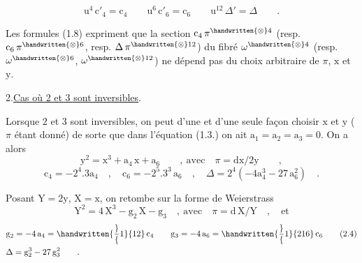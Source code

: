 \[
\mathrm{u}^{4}\,\mathrm{c}'_{4}=\mathrm{c}_{4}\qquad
\mathrm{u}^{6}\,\mathrm{c}'_{6}=\mathrm{c}_{6}\qquad
\mathrm{u}^{12}\,\Delta'=\Delta\qquad.
\tag*{(1.8)}
\]

Les formules (1.8) expriment que la section $\mathrm{c}_{4}\,\pi^{\handwritten{\otimes}4}$ (resp. $\mathrm{c}_{6}\,\pi^{\handwritten{\otimes}6}$, resp. $\Delta\,\pi^{\handwritten{\otimes}12}$) du fibré $\omega^{\handwritten{\otimes}4}$ (resp. $\omega^{\handwritten{\otimes}6}$, $\omega^{\handwritten{\otimes}12}$) ne dépend pas du choix arbitraire de $\pi$, $\mathrm{x}$ et $\mathrm{y}$.
\par\noindent\hfill
{}
\par\vspace{7.7\baselineskip}

2.\qquad \uline{Cas où 2 et 3 sont inversibles}.\margin{\handwritten{$\backslash$}}

Lorsque $2$ et $3$ sont inversibles, on peut d'une et d'une seule façon choisir $\mathrm{x}$ et $\mathrm{y}$ ($\pi$ étant donné) de sorte que dans l'équation (1.3.) on ait $\mathrm{a}_{1}=\mathrm{a}_{2}=\mathrm{a}_{3}=0$. On a alors
\[
\mathrm{y}^{2}=\mathrm{x}^{3}+\mathrm{a}_{4}\,\mathrm{x}+\mathrm{a}_{6}\qquad,\ \text{avec}\quad\pi=\mathrm{dx}/2\mathrm{y}\qquad,
\tag*{(2.1)}
\]
\[
\mathrm{c}_{4}=-2^{4}.3\mathrm{a}_{4}\quad,\quad
\mathrm{c}_{6}=-2^{5}.3^{3}\,\mathrm{a}_{6}\quad,\quad
\Delta=2^{4}(-4\mathrm{a}_{4}^{3}-27\,\mathrm{a}_{6}^{2})\quad.
\tag*{(2.2)}
\]

Posant $\mathrm{Y}=2\mathrm{y}$, $\mathrm{X}=\mathrm{x}$, on retombe sur la forme de Weierstrass
\[
\mathrm{Y}^{2}=4\,\mathrm{X}^{3}-\mathrm{g}_{2}\,\mathrm{X}-\mathrm{g}_{3}\quad,\ \text{avec}\quad\pi=\mathrm{d}\,\mathrm{X}/\mathrm{Y}\quad,\quad\text{et}
\tag*{(2.3)}
\]
\[
\begin{aligned}[t]
&\mathrm{g}_{2}=-4\,\mathrm{a}_{4}=\handwritten{\frac}{1}{12}\,\mathrm{c}_{4}\qquad
\mathrm{g}_{3}=-4\,\mathrm{a}_{6}=\handwritten{\frac}{1}{216}\,\mathrm{c}_{6}\\
&\Delta=\mathrm{g}_{2}^{3}-27\,\mathrm{g}_{3}^{2}\qquad.
\end{aligned}
\tag*{(2.4)}
\]


